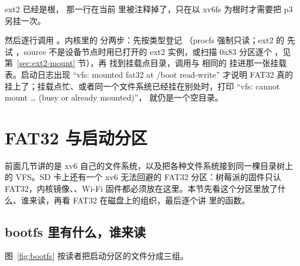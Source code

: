 ext2 已经是根， 那一行在当前  里被注释掉了，只在以 xv6fs 为根时才需要把 p3 另挂一次。

然后逐行调用 。内核里的  分两步：先按类型登记 （procfs 强制只读；ext2 的  先试 ，source 不是设备节点时用已打开的 ext2 实例，或扫描 0x83 分区逐个 ，见第~\ref{sec:ext2-mount} 节），再  找到挂载点目录，调用与  相同的  挂进那一张挂载表。启动日志出现 “vfs: mounted fat32 at /boot read-write” 才说明 FAT32 真的挂上了；挂载点忙、或者同一个文件系统已经挂在别处时，打印 “vfs: cannot mount … (busy or already mounted)”， 就仍是一个空目录。

\section{FAT32 与启动分区}
\label{sec:fat32}

前面几节讲的是 xv6 自己的文件系统，以及把各种文件系统接到同一棵目录树上的 VFS。SD 卡上还有一个 xv6 无法回避的 FAT32 分区：树莓派的固件只认 FAT32，内核镜像、、Wi-Fi 固件都必须放在这里。本节先看这个分区里放了什么、谁来读，再看 FAT32 在磁盘上的组织，最后逐个讲  里的函数。

\subsection{bootfs 里有什么，谁来读}

图~\ref{fig:bootfs} 按读者把启动分区的文件分成三组。

